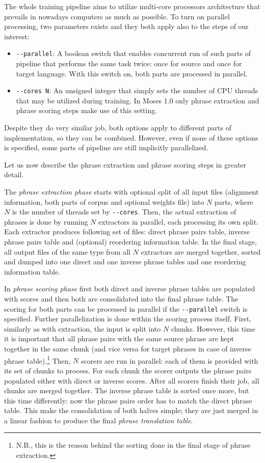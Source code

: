 The whole training pipeline aims to utilize multi-core processors architecture that
prevails in nowadays computers as much as possible. To turn on parallel processing,
two parameters exists and they both apply also to the steps of our interest:
\begin{itemize}
  \item \verb|--parallel|: A boolean switch that enables concurrent run of such parts of
  pipeline that performs the same task twice: once for source and once for target language.
  With this switch on, both parts are processed in parallel.
  \item \verb|--cores N|: An unsigned integer that simply sets the number of CPU threads
  that may be utilized during training. In Moses 1.0 only phrase extraction and phrase
  scoring steps make use of this setting.
\end{itemize}
Despite they do very similar job, both options apply to different parts
of implementation, so they can be combined.
However, even if none of these options is specified, some parts of pipeline
are still implicitly parallelized.

Let us now describe the phrase extraction and phrase scoring steps in greater detail.

The \emph{phrase extraction phase} starts with optional split of all input files
(alignment information, both parts of corpus and optional weights file) into $N$
parts, where $N$ is the number of threads set by \verb|--cores|.
Then, the actual extraction of phrases is done by running $N$ extractors in parallel,
each processing its own split.
Each extractor produces following set of files: direct phrase pairs table, inverse
phrase pairs table and (optional) reordering information table.
In the final stage, all output files of the same type from all $N$ extractors are
merged together, sorted and dumped into one direct and one inverse phrase tables
and one reordering information table.

In \emph{phrase scoring phase} first both direct and inverse phrase tables are
populated with scores and then both are consolidated into the final phrase table.
The scoring for both parts can be processed in parallel if the \verb|--parallel|
switch is specified.
Further parallelization is done within the scoring process itself.
First, similarly as with extraction, the input is split into $N$ chunks.
However, this time it is important that all phrase pairs with the same source
phrase are kept together in the same chunk (and vice versa for target phrases
in case of inverse phrase table).\footnote{N.B., this is the reason behind
the sorting done in the final stage of phrase extraction.}
Then, $N$ scorers are run in parallel: each of them is provided with its set
of chunks to process.
For each chunk the scorer outputs the phrase pairs populated either with direct
or inverse scores.
After all scorers finish their job, all chunks are merged together.
The inverse phrase table is sorted once more, but this time differently:
now the phrase pairs order has to match the direct phrase table.
This make the consolidation of both halves simple; they are just merged
in a linear fashion to produce the final \emph{phrase translation table}.

